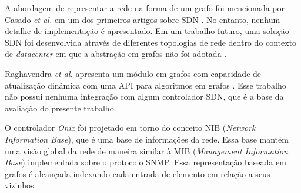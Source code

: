 A abordagem de representar a rede na forma de um grafo foi mencionada
por Casado \emph{et al.} em um dos primeiros artigos sobre SDN
\citep{martin2010virtualizing}.
No entanto, nenhum detalhe de implementação é apresentado.
Em um trabalho futuro, uma solução SDN foi desenvolvida através de
diferentes topologias de rede dentro do contexto de \emph{datacenter}
em que a abstração em grafos não foi adotada \citep{ripcord}.

Raghavendra \emph{et al.} apresenta um módulo em grafos com capacidade
de atualização dinâmica com uma API para algoritmos em grafos
\citep{ramya2012dynamic}.
Esse trabalho não possui nenhuma integração com algum controlador SDN,
que é a base da avaliação do presente trabalho.

O controlador \emph{Onix} \citep{teemu2010onix} foi projetado em torno do
conceito NIB (\emph{Network Information Base}), que é uma base
de informações da rede.
Essa base mantém uma visão global da rede de maneira similar à
MIB (\emph{Management Information Base}) implementada sobre o
protocolo SNMP.
Essa representação baseada em grafos é alcançada indexando cada
entrada de elemento em relação a seus vizinhos.
